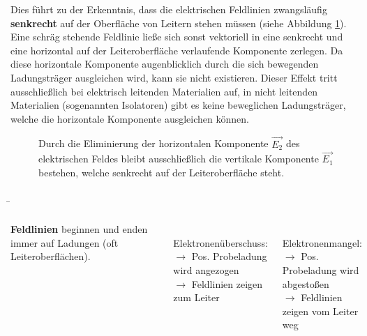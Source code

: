 \begin{frame}
{\begin{figure}[ht]
	\end{figure}

	Dies führt zu der Erkenntnis, dass die elektrischen Feldlinien zwangsläufig \textbf{senkrecht} auf der
	Oberfläche von Leitern stehen müssen (siehe Abbildung \ref{fig:e_vertikal}). Eine schräg stehende Feldlinie ließe sich sonst vektoriell
	 in eine senkrecht und eine horizontal auf der Leiteroberfläche verlaufende Komponente zerlegen. Da diese 
	 horizontale Komponente augenblicklich durch die sich bewegenden Ladungsträger ausgleichen wird, kann 
	 sie nicht existieren. Dieser Effekt tritt ausschließlich bei elektrisch leitenden Materialien auf, in nicht leitenden Materialien
	  (sogenannten Isolatoren) gibt es keine beweglichen Ladungsträger, welche die horizontale Komponente ausgleichen können.


	 \begin{figure}[ht]
		\centering
		\caption{Durch die Eliminierung der horizontalen Komponente $\vec{E_2}$ des elektrischen Feldes bleibt ausschließlich die vertikale Komponente $\vec{E_1}$ bestehen, welche senkrecht auf der Leiteroberfläche steht. }
		\label{fig:e_vertikal}
	\end{figure}

	
	}
	
	
	\b{

	\begin{columns}

	   \textbf{Feldlinien} beginnen und enden immer auf Ladungen (oft Leiteroberflächen).
		
		
		\phantom{.}\\

		
			Elektronenüberschuss:\\
			$\rightarrow$ Pos. Probeladung wird angezogen\\
			$\rightarrow$ Feldlinien zeigen zum Leiter
			
			\phantom{.}\\


			Elektronenmangel:\\
			$\rightarrow$ Pos. Probeladung wird abgestoßen\\
			$\rightarrow$ Feldlinien zeigen vom Leiter weg
			


\end{columns}}
\end{frame}
